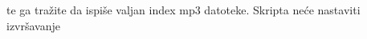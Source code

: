 \documentclass{exam}
\begin{document}
\begin{itemize}
                                                                                                                                                                                                    te
                                                                                                                                                                                                    ga
                                                                                                                                                                                                    tražite
                                                                                                                                                                                                    da
                                                                                                                                                                                                    ispiše
                                                                                                                                                                                                    valjan
                                                                                                                                                                                                    index
                                                                                                                                                                                                    mp3
                                                                                                                                                                                                    datoteke.
                                                                                                                                                                                                    Skripta
                                                                                                                                                                                                    neće
                                                                                                                                                                                                    nastaviti
                                                                                                                                                                                                    izvršavanje

\end{itemize}
\end{document}
